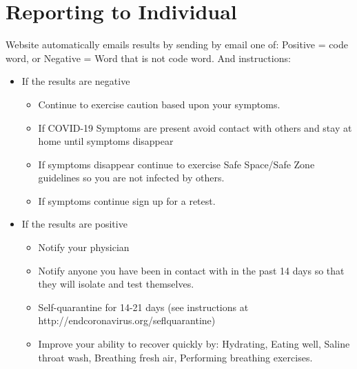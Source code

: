 \documentclass[onecolumn,journal]{IEEEtran}
\begin{document}
\section{Reporting to Individual}
Website automatically emails results by sending by email one of: Positive = code word, or Negative = Word that is not code word.  And instructions:
\begin{itemize}
\item If the results are negative 
\begin{itemize}
	\item Continue to exercise caution based upon your symptoms. 
	\item If COVID-19 Symptoms are present avoid contact with others and stay at home until symptoms disappear
	\item If symptoms disappear continue to exercise Safe Space/Safe Zone guidelines so you are not infected by others.
	\item If symptoms continue sign up for a retest. 
	\end{itemize}
\item If the results are positive 
\begin{itemize}
	\item Notify your physician 
	\item Notify anyone you have been in contact with in the past 14 days so that they will isolate and test themselves.
	\item Self-quarantine for 14-21 days (see instructions at http://endcoronavirus.org/seflquarantine)
	\item Improve your ability to recover quickly by: Hydrating, Eating well, Saline throat wash, Breathing fresh air, Performing breathing exercises.
	\end{itemize}
\end{itemize}

	

	
% 
\end{document}
